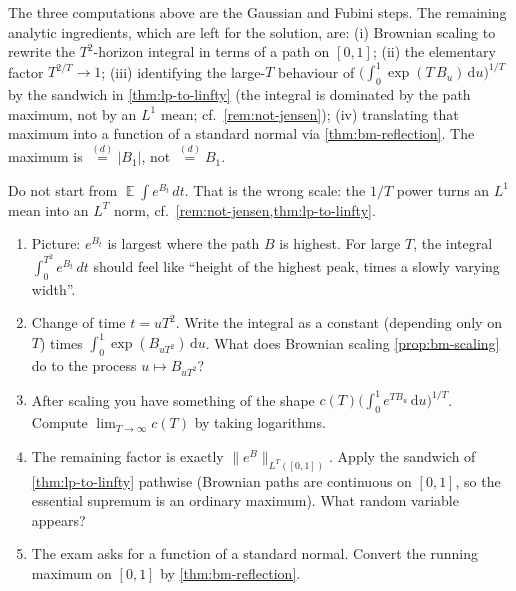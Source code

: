 \documentclass[11pt,a4paper]{article}
\DeclareMathOperator{\E}{\mathbb{E}}
\begin{document}
\begin{remark}
\label{rem:p4-toolkit}
The three computations above are the Gaussian and Fubini steps. The remaining analytic ingredients, which are left for the solution, are: (i) Brownian scaling to rewrite the \(T^{2}\)-horizon integral in terms of a path on \([0,1]\); (ii) the elementary factor \(T^{2/T}\to 1\); (iii) identifying the large-\(T\) behaviour of \(\bigl(\int_{0}^{1} \exp(T\,B_{u})\,\mathrm{d}u\bigr)^{1/T}\) by the sandwich in \cref{thm:lp-to-linfty} (the integral is dominated by the path maximum, not by an \(L^{1}\) mean; cf.\ \cref{rem:not-jensen}); (iv) translating that maximum into a function of a standard normal via \cref{thm:bm-reflection}. The maximum is \(\stackrel{(d)}{=}|B_1|\), not \(\stackrel{(d)}{=}B_1\).
\end{remark}

\begin{remark}
\label{rem:p4-hints}
Do not start from \(\E\int e^{B_t}\,dt\). That is the wrong scale: the \(1/T\) power turns an \(L^{1}\) mean into an \(L^{T}\) norm, cf.\ \cref{rem:not-jensen,thm:lp-to-linfty}.
\begin{enumerate}[label=\textup{(\arabic*)}]
    \item
    Picture: \(e^{B_t}\) is largest where the path \(B\) is highest. For large \(T\), the integral \(\int_0^{T^{2}}e^{B_t}\,dt\) should feel like ``height of the highest peak, times a slowly varying width''.
    \item
    Change of time \(t=uT^{2}\). Write the integral as a constant (depending only on \(T\)) times \(\int_0^{1}\exp(B_{uT^{2}})\,\mathrm{d}u\). What does Brownian scaling \cref{prop:bm-scaling} do to the process \(u\mapsto B_{uT^{2}}\)?
    \item
    After scaling you have something of the shape \(c(T)\bigl(\int_0^{1}e^{T B_u}\,\mathrm{d}u\bigr)^{1/T}\). Compute \(\lim_{T\to\infty}c(T)\) by taking logarithms.
    \item
    The remaining factor is exactly \(\|e^{B}\|_{L^{T}([0,1])}\). Apply the sandwich of \cref{thm:lp-to-linfty} pathwise (Brownian paths are continuous on \([0,1]\), so the essential supremum is an ordinary maximum). What random variable appears?
    \item
    The exam asks for a function of a standard normal. Convert the running maximum on \([0,1]\) by \cref{thm:bm-reflection}.
\end{enumerate}
\end{remark}
\end{document}
